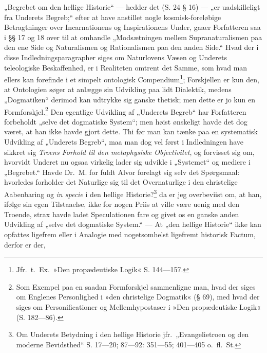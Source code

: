 „Begrebet om den hellige Historie“ --- hedder det
 (S. 24 § 16) --- „er uadskilleligt fra Underets Begreb;“ efter at
have anstillet nogle kosmisk-foreløbige Betragtninger over
Incarnationens og Inspirationens Under, gaaer Forfatteren saa i
§§ 17 og 18 over til at omhandle „Modsætningen mellem
Supranaturalismen paa den ene Side og Naturalismen og
Rationalismen paa den anden Side.“ Hvad der i disse
Indledningsparagrapher siges om Naturlovens Væsen og Underets
teleologiske Beskaffenhed, er i Realiteten omtrent det Samme, som
hvad man ellers kan forefinde i et simpelt ontologisk
Compendium\footnote{Jfr.\ t.\ Ex.\ »Den propædeutiske Logik«
S. 144---157.}; Forskjellen er kun den, at Ontologien søger at
anlægge sin Udvikling paa lidt Dialektik, medens „Dogmatiken“
derimod kan udtrykke sig ganske thetisk; men dette er jo kun en
Formforskjel.\footnote{Som Exempel paa en saadan Formforskjel
sammenligne man, hvad der siges om Englenes Personlighed i »den
christelige Dogmatik« (§ 69), med hvad der siges om
Personificationer og Mellemhypostaser i »Den propædeutiske Logik«
(S. 182---86).} Den egentlige Udvikling af „Underets Begreb“ har
Forfatteren forbeholdt „selve det dogmatiske System“; men høist
ønskeligt havde det dog været, at han ikke havde gjort dette. Thi
før man kan tænke paa en systematisk Udvikling af „Underets
Begreb“, maa man dog vel først i Indledningen have sikkret sig
\emph{Troens Forhold til den metaphysiske Objectivitet}, og
forvisset sig om, hvorvidt Underet nu ogsaa virkelig lader sig
udvikle i „Systemet“ og mediere i „Begrebet.“ Havde Dr.\ M. for
fuldt Alvor
 forelagt sig selv det Spørgsmaal: hvorledes forholder det
Naturlige sig til det Overnaturlige i den christelige Aabenbaring
og \textit{in specie} i den hellige Historie?\footnote{Om Underets
Betydning i den hellige Historie jfr.\ „Evangelietroen og den
moderne Bevidsthed“ S. 17---20; 87---92: 351---55; 401---405 o.\
fl.\ St.} da er jeg overbeviist om, at han, ifølge sin egen
Tilstaaelse, ikke for nogen Priis at ville være uenig med den
Troende, strax havde ladet Speculationen fare og givet os en
ganske anden Udvikling af „selve det dogmatiske System.“ --- At
„den hellige Historie“ ikke kan opfattes ligefrem eller i Analogie
med nogetsomhelst ligefremt historisk Factum, derfor er der,
